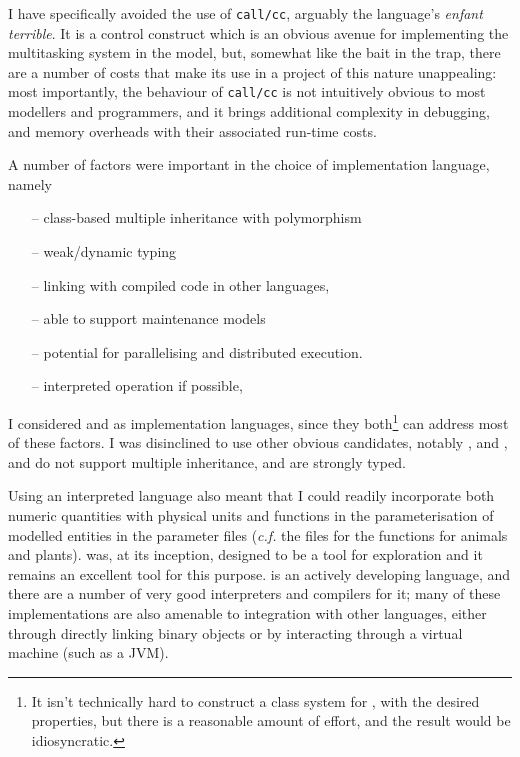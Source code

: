 I have specifically avoided the use of \texttt{call/cc}, arguably the
language's \emph{enfant terrible}. It is a control construct which is
an obvious avenue for implementing the multitasking system in the
model, but, somewhat like the bait in the trap, there are a number of
costs that make its use in a project of this nature unappealing: most
importantly, the behaviour of \texttt{call/cc} is not intuitively
obvious to most modellers and programmers, and it brings additional
complexity in debugging, and memory overheads with their associated
run-time costs.

A number of factors were important in the choice of implementation
language, namely
\begin{itemize}
\item[--] class-based multiple inheritance with polymorphism\\
\item[--] weak/dynamic typing\\
\item[--] linking with compiled code in other languages,\\
\item[--] able to support maintenance models\\
\item[--] potential for parallelising and distributed execution.\\

\item[--] interpreted operation if possible,
\end{itemize}

I considered \Cpp and \CC as implementation languages, since they
both\footnote{It isn't technically hard to construct a class system
for \CC, with the desired properties, but there is a reasonable amount
of effort, and the result would be idiosyncratic.} can address most of
these factors. I was disinclined to use other obvious candidates,
notably \Java, and \Csharp, and \DD do not support multiple
inheritance, and are strongly typed.

Using an interpreted language also meant that I could readily
incorporate both numeric quantities with physical units and functions
in the parameterisation of modelled entities in the parameter files
(\emph{c.f.}  the files for the
 functions for animals and plants). \Scheme was,
at its inception, designed to be a tool for exploration
\cite{sussman1998first} and it remains an excellent tool for this
purpose. \Scheme is an actively developing language, and there are a
number of very good interpreters and compilers for it; many of these
implementations are also amenable to integration with other languages,
either through directly linking binary objects or by interacting
through a virtual machine (such as a JVM).

